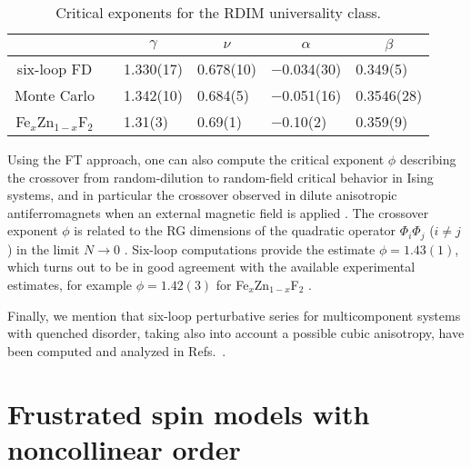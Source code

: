\documentclass[a4paper,12pt]{article}
\begin{document}
\begin{table*}
\caption{
Critical exponents for the RDIM universality class.}
\label{rimexp}
\footnotesize
\begin{center}
\begin{tabular}{ccllll}
\hline
\multicolumn{1}{c}{}& 
\multicolumn{1}{c}{}& 
\multicolumn{1}{c}{$\gamma$}& 
\multicolumn{1}{c}{$\nu$}& 
\multicolumn{1}{c}{$\alpha$}&
\multicolumn{1}{c}{$\beta$}\\ 
\hline  
six-loop FD & \cite{PV-00} & 1.330(17) & 0.678(10)  & $-$0.034(30) & 0.349(5)\\
Monte Carlo & \cite{BFMMPR-98}  & 1.342(10) & 0.684(5)   & $-$0.051(16) & 0.3546(28) \\
Fe$_x$Zn$_{1-x}$F$_2$  & \cite{Belanger-00}  & 1.31(3) & 0.69(1) & $-$0.10(2) & 0.359(9) \\
\hline
\end{tabular}
\end{center}
\end{table*}



Using the FT approach, one can also compute the critical exponent $\phi$ 
describing the crossover from random-dilution to random-field
critical behavior in Ising systems,
and in particular the crossover observed in dilute anisotropic
antiferromagnets when an external magnetic field is applied \cite{Belanger-00}.
The crossover exponent $\phi$ is related to the RG dimensions of
the quadratic operator $\Phi_i\Phi_j$ ($i\neq j$) in the 
limit $N\rightarrow 0$ \cite{Aharony-86}.
Six-loop computations \cite{CPV-inprep}
provide the estimate $\phi=1.43(1)$,
which turns out to be in
good agreement with the available experimental estimates,
for example $\phi=1.42(3)$ for Fe$_x$Zn$_{1-x}$F$_2$ \cite{Belanger-00}.

Finally, we mention that six-loop perturbative series for multicomponent
systems with quenched disorder, taking also into account a possible
cubic anisotropy, have been computed and analyzed in Refs.~\cite{PV-00,CPV-03}.


\section{Frustrated spin models with noncollinear order}
\label{chiral}
\end{document}
